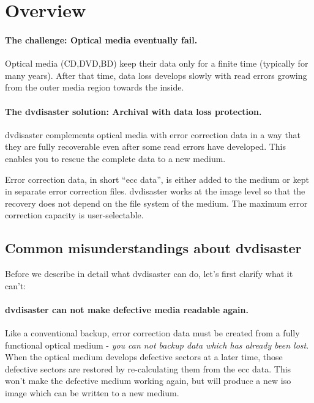 \section{Overview}

\paragraph{The challenge: Optical media eventually fail.} Optical media (CD,DVD,BD) keep their data only for a finite time (typically for many years). 
After that time, data loss develops slowly with read errors growing from the outer 
media region towards the inside. 

\paragraph{The dvdisaster solution: Archival with data loss protection.}
dvdisaster complements optical media  with
error correction data
in a way that they are fully recoverable 
even after some read errors have developed. 
This enables you to rescue the complete data to a new medium.

Error correction data, in short ``ecc data'',  is either added to the medium 
or kept in separate error correction files. dvdisaster works at the image level 
so that the recovery does not depend on the file system of the medium. 
The maximum error correction capacity is user-selectable.

\subsection{Common misunderstandings about dvdisaster}

Before we describe in detail what dvdisaster can do, let's first clarify what it can't:

\paragraph{dvdisaster can not make defective media readable again.}
Like a conventional backup, error correction data must be created from 
a fully functional optical medium - {\em you can not backup data which has already
been lost}. When the optical medium develops defective sectors at a later time,
those defective sectors are restored by re-calculating them from the ecc data. 
This won't make the defective medium working again, but will produce a new iso 
image which can be written to a new medium. 

